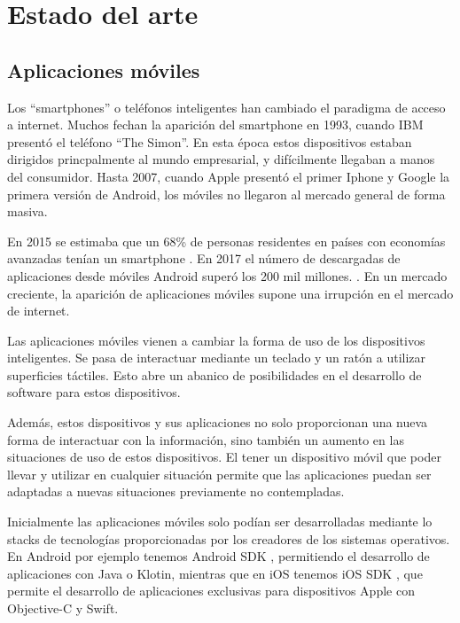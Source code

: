 \chapter{Estado del arte}

\section{Aplicaciones móviles}

Los ``smartphones'' o teléfonos inteligentes han cambiado el paradigma de acceso a internet. Muchos fechan la aparición del smartphone en 1993, cuando IBM presentó el teléfono ``The Simon''. En esta época estos dispositivos estaban dirigidos princpalmente al mundo empresarial, y difícilmente llegaban a manos del consumidor. Hasta 2007, cuando Apple presentó el primer Iphone y Google la primera versión de Android, los móviles no llegaron al mercado general de forma masiva. \cite{sarwar2013impact}

En 2015 se estimaba que un 68\% de personas residentes en países con economías avanzadas tenían un smartphone \cite{poushter2016smartphone}. En 2017 el número de descargadas de aplicaciones desde móviles Android superó los 200 mil millones. \cite{10.1145/3278532.3278558}. En un mercado creciente, la aparición de aplicaciones móviles supone una irrupción en el mercado de internet.

Las aplicaciones móviles vienen a cambiar la forma de uso de los dispositivos inteligentes. Se pasa de interactuar mediante un teclado y un ratón a utilizar superficies táctiles. Esto abre un abanico de posibilidades en el desarrollo de software para estos dispositivos.

Además, estos dispositivos y sus aplicaciones no solo proporcionan una nueva forma de interactuar con la información, sino también un aumento en las situaciones de uso de estos dispositivos. El tener un dispositivo móvil que poder llevar y utilizar en cualquier situación permite que las aplicaciones puedan ser adaptadas a nuevas situaciones previamente no contempladas. 

Inicialmente las aplicaciones móviles solo podían ser desarrolladas mediante lo stacks de tecnologías proporcionadas por los creadores de los sistemas operativos. En Android por ejemplo tenemos Android SDK \cite{android-sdk}, permitiendo el desarrollo de aplicaciones con Java o Klotin, mientras que en iOS tenemos iOS SDK \cite{ios-sdk}, que permite el desarrollo de aplicaciones exclusivas para dispositivos Apple con Objective-C y Swift.

